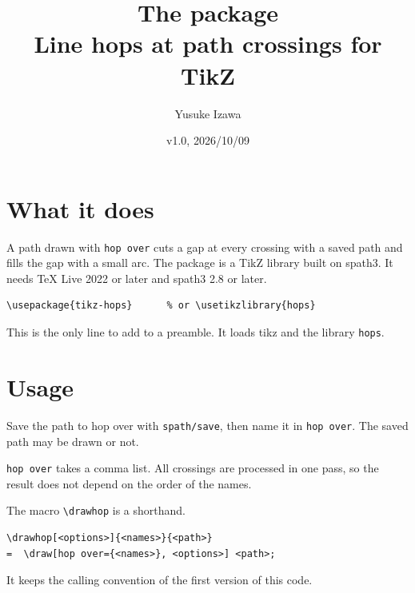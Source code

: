 \documentclass[a4paper]{article}
\title{The \pkg{tikz-hops} package\\\large Line hops at path crossings for TikZ}
\author{Yusuke Izawa}
\date{v1.0, 2026/10/09}
\newcommand\key[1]{\texttt{#1}}
\newcommand\pkg[1]{\textsf{#1}}
\newenvironment{example}
  {\VerbatimOut{\jobname.ex}}
  {\endVerbatimOut\par\medskip\noindent
   \VerbatimInput[frame=single,fontsize=\small]{\jobname.ex}\par\smallskip
   \noindent\par\medskip}
\begin{document}
\maketitle

\section{What it does}
A path drawn with \key{hop over} cuts a gap at every crossing with a saved
path and fills the gap with a small arc.
The package is a TikZ library built on \pkg{spath3}.
It needs TeX Live 2022 or later and \pkg{spath3} 2.8 or later.

\begin{Verbatim}[frame=single,fontsize=\small]
\usepackage{tikz-hops}      % or \usetikzlibrary{hops}
\end{Verbatim}
\noindent This is the only line to add to a preamble. It loads
\pkg{tikz} and the library \texttt{hops}.

\section{Usage}
Save the path to hop over with \key{spath/save}, then name it in
\key{hop over}.
The saved path may be drawn or not.

\begin{example}
\end{example}

\key{hop over} takes a comma list.
All crossings are processed in one pass, so the result does not depend on the
order of the names.

\begin{example}
\end{example}

The macro \verb|\drawhop| is a shorthand.
\begin{Verbatim}[frame=single,fontsize=\small]
\drawhop[<options>]{<names>}{<path>}
=  \draw[hop over={<names>}, <options>] <path>;
\end{Verbatim}
It keeps the calling convention of the first version of this code.
\end{document}
